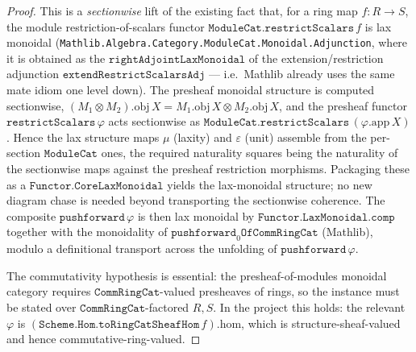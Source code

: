 \begin{proof}

\leanok
  This is a \emph{sectionwise} lift of the existing fact that, for a ring map
  \(f : R \to S\), the module restriction-of-scalars functor
  \(\mathtt{ModuleCat.restrictScalars}\,f\) is lax monoidal
  (\texttt{Mathlib.Algebra.Category.ModuleCat.Monoidal.Adjunction}, where it is
  obtained as the \(\mathtt{rightAdjointLaxMonoidal}\) of the
  extension/restriction adjunction \(\mathtt{extendRestrictScalarsAdj}\) ---
  i.e.\ Mathlib already uses the same mate idiom one level down). The presheaf
  monoidal structure is computed sectionwise,
  \((M_1 \otimes M_2).\mathrm{obj}\,X = M_1.\mathrm{obj}\,X \otimes M_2.\mathrm{obj}\,X\),
  and the presheaf functor \(\mathtt{restrictScalars}\,\varphi\) acts
  sectionwise as \(\mathtt{ModuleCat.restrictScalars}\,(\varphi.\mathrm{app}\,X)\).
  Hence the lax structure maps \(\mu\) (laxity) and \(\varepsilon\) (unit)
  assemble from the per-section \(\mathtt{ModuleCat}\) ones, the required
  naturality squares being the naturality of the sectionwise maps against the
  presheaf restriction morphisms. Packaging these as a
  \(\mathtt{Functor.CoreLaxMonoidal}\) yields the lax-monoidal structure; no
  new diagram chase is needed beyond transporting the sectionwise coherence.
  The composite \(\mathtt{pushforward}\,\varphi\) is then lax monoidal by
  \(\mathtt{Functor.LaxMonoidal.comp}\) together with the monoidality of
  \(\mathtt{pushforward}_0\mathtt{OfCommRingCat}\) (Mathlib), modulo a definitional
  transport across the unfolding of \(\mathtt{pushforward}\,\varphi\).

  The commutativity hypothesis is essential: the presheaf-of-modules monoidal
  category requires \(\mathtt{CommRingCat}\)-valued presheaves of rings, so the
  instance must be stated over \(\mathtt{CommRingCat}\)-factored \(R, S\). In
  the project this holds: the relevant \(\varphi\) is
  \((\mathtt{Scheme.Hom.toRingCatSheafHom}\,f).\mathrm{hom}\), which is
  structure-sheaf-valued and hence commutative-ring-valued.
\end{proof}

